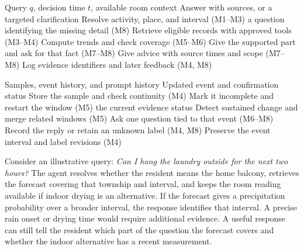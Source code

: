 \begin{algorithm}[t]
\caption{Answer a household query (M1--M8)}\label{alg:query}
\begin{algorithmic}[1]
\Require Query $q$, decision time $t$, available room context
\Ensure Answer with sources, or a targeted clarification
\State Resolve activity, place, and interval (M1--M3)
  \State \Return a question identifying the missing detail (M8)
\EndIf
\State Retrieve eligible records with approved tools (M3--M4)
\State Compute trends and check coverage (M5--M6)
  \State Give the supported part and ask for that fact (M7--M8)
\Else
  \State Give advice with source times and scope (M7--M8)
\EndIf
\State Log evidence identifiers and later feedback (M4, M8)
\end{algorithmic}
\end{algorithm}
\begin{algorithm}[t]
\caption{Monitor events and collect feedback (M4--M8)}\label{alg:monitor}
\begin{algorithmic}[1]
\Require Samples, event history, and prompt history
\Ensure Updated event and confirmation status
\State Store the sample and check continuity (M4)
  \State Mark it incomplete and restart the window (M5)
  \State \Return the current evidence status
\EndIf
\State Detect sustained change and merge related windows (M5)
  \State Ask one question tied to that event (M6--M8)
  \State Record the reply or retain an unknown label (M4, M8)
\EndIf
\State Preserve the event interval and label revisions (M4)
\end{algorithmic}
\end{algorithm}

Consider an illustrative query: \emph{Can I hang the laundry outside for the next two hours?} The agent resolves whether the resident means the home balcony, retrieves the forecast covering that township and interval, and keeps the room reading available if indoor drying is an alternative. If the forecast gives a precipitation probability over a broader interval, the response identifies that interval. A precise rain onset or drying time would require additional evidence. A useful response can still tell the resident which part of the question the forecast covers and whether the indoor alternative has a recent measurement.

